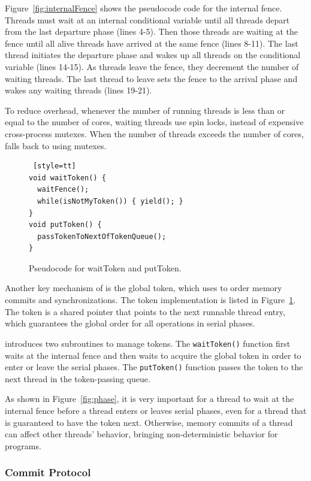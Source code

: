 Figure~\ref{fig:internalFence} shows the pseudocode code for the internal fence. Threads must wait at an internal conditional variable until all threads depart from the last departure phase (lines 4-5). Then those threads are waiting at the fence until all alive threads have arrived at the same fence (lines 8-11). The last thread initiates the departure phase and wakes up all threads on the conditional variable (lines 14-15). As threads leave the fence, they decrement the number of waiting threads.  The last thread to leave sets the fence to the arrival phase and wakes any waiting threads (lines 19-21).

To reduce overhead, whenever the number of running threads is less than or equal to the number of cores, waiting threads use spin locks, instead of expensive cross-process \pthreads{} mutexes. When the number of threads exceeds the number of cores, \dthreads{} falls back to using \pthreads{} mutexes.

\begin{figure}
\begin{lstlisting} [style=tt]
void waitToken() {
  waitFence();
  while(isNotMyToken()) { yield(); }
}
void putToken() {
  passTokenToNextOfTokenQueue();
}
\end{lstlisting}
\caption{Pseudocode for waitToken and putToken. 
\label{fig:token}}
\end{figure}

Another key mechanism of \dthreads{} is the global token, which \dthreads{} uses to order memory commits and synchronizations. The token implementation is listed in Figure~\ref{fig:token}. The token is a shared pointer that points to the next runnable thread entry, which guarantees the global order for all operations in serial phases.  

\dthreads{} introduces two subroutines to manage tokens.  The \texttt{waitToken()} function first waits at the internal fence and then waits to acquire the global token in order to enter or leave the serial phases. The \texttt{putToken()} function passes the token to the next thread in the token-passing queue. 

As shown in Figure~\ref{fig:phase}, it is very important for a thread to wait at the internal fence before a thread enters or leaves serial phases, even for a thread that is guaranteed to have the token next. Otherwise, memory commits of a thread can affect other threads' behavior, bringing non-deterministic behavior for programs. 

\subsubsection{Commit Protocol}

